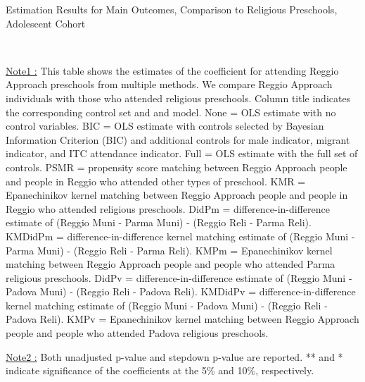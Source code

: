 \begin{table}[H] \caption{Estimation Results for Main Outcomes, Comparison to Religious Preschools, Adolescent Cohort} \label{ols-M-adol-reg-reli}
\scalebox{0.59}{}
\vspace{1ex} \\
\footnotesize\raggedright{\underline{Note1 :} This table shows the estimates of the coefficient for attending Reggio Approach preschools from multiple methods. We compare Reggio Approach individuals with those who attended religious preschools. Column title indicates the corresponding control set and and model. None = OLS estimate with no control variables. BIC = OLS estimate with controls selected by Bayesian Information Criterion (BIC) and additional controls for male indicator, migrant indicator, and ITC attendance indicator. Full = OLS estimate with the full set of controls. PSMR =  propensity score matching between Reggio Approach people and people in Reggio who attended other types of preschool. KMR = Epanechinikov kernel matching between Reggio Approach people and people in Reggio who attended religious preschools. DidPm = difference-in-difference estimate of (Reggio Muni - Parma Muni) - (Reggio Reli - Parma Reli). KMDidPm = difference-in-difference kernel matching estimate of (Reggio Muni - Parma Muni) - (Reggio Reli - Parma Reli). KMPm = Epanechinikov kernel matching between Reggio Approach people and people who attended Parma religious preschools. DidPv = difference-in-difference estimate of (Reggio Muni - Padova Muni) - (Reggio Reli - Padova Reli). KMDidPv = difference-in-difference kernel matching estimate of (Reggio Muni - Padova Muni) - (Reggio Reli - Padova Reli).  KMPv = Epanechinikov kernel matching between Reggio Approach people and people who attended Padova religious preschools.}

\footnotesize\raggedright{\underline{Note2 :} Both unadjusted p-value and stepdown p-value are reported. ** and * indicate significance of the coefficients at the 5\% and 10\%, respectively.}

\end{table}

